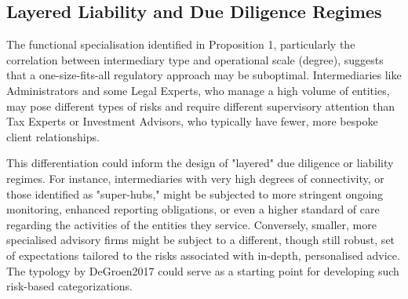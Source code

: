 \subsection{Layered Liability and Due Diligence Regimes}
\label{subsec:layered_liability}

The functional specialisation identified in Proposition 1, particularly the correlation between intermediary type and operational scale (degree), suggests that a one-size-fits-all regulatory approach may be suboptimal. Intermediaries like Administrators and some Legal Experts, who manage a high volume of entities, may pose different types of risks and require different supervisory attention than Tax Experts or Investment Advisors, who typically have fewer, more bespoke client relationships.

This differentiation could inform the design of "layered" due diligence or liability regimes. For instance, intermediaries with very high degrees of connectivity, or those identified as "super-hubs," might be subjected to more stringent ongoing monitoring, enhanced reporting obligations, or even a higher standard of care regarding the activities of the entities they service. Conversely, smaller, more specialised advisory firms might be subject to a different, though still robust, set of expectations tailored to the risks associated with in-depth, personalised advice. The typology by DeGroen2017 could serve as a starting point for developing such risk-based categorizations.

